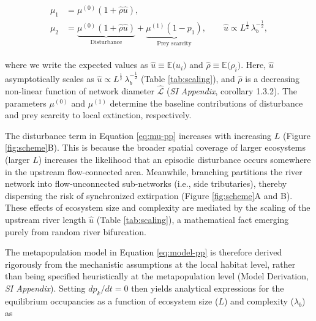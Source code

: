 \documentclass[11pt, class=article, crop=false]{standalone}
\theoremstyle{definition}
\begin{document}
\begin{align}
    \begin{split}
        \mu_1 
        &= 
        \mu^{(0)}(1 + \hat{\rho} \hat{u}),\\
        \mu_2 
        &= 
        \underbrace{\mu^{(0)}(1 + \hat{\rho} \hat{u})}_{\text{Disturbance}} + \underbrace{\mu^{(1)} (1 - p_{1})}_{\text{Prey scarcity}},
        \qquad 
        \hat{u} 
        \propto 
        L^{\frac{1}{2}}\,\lambda_b^{-\frac{1}{2}},
    \end{split}
\label{eq:mu-pp}
\end{align}

where we write the expected values as $\hat{u} \equiv \mathbb{E}\bigl(u_i\bigr)$ and $\hat{\rho} \equiv \mathbb{E}\bigl(\rho_i\bigr)$. 
Here, $\hat{u}$ asymptotically scales as $\hat{u} \propto L^{\frac{1}{2}}\,\lambda_b^{-\frac{1}{2}}$ (Table \ref{tab:scaling}), and $\hat{\rho}$ is a decreasing non-linear function of network diameter $\hat{\mathcal{L}}$ (\textit{SI Appendix}, corollary 1.3.2).
The parameters $\mu^{(0)}$ and $\mu^{(1)}$ determine the baseline contributions of disturbance and prey scarcity to local extinction, respectively.

The disturbance term in Equation \ref{eq:mu-pp} increases with increasing $L$ (Figure \ref{fig:scheme}B). 
This is because the broader spatial coverage of larger ecosystems (larger $L$) increases the likelihood that an episodic disturbance occurs somewhere in the upstream flow-connected area.
Meanwhile, branching partitions the river network into flow-unconnected sub-networks (i.e., side tributaries), thereby dispersing the risk of synchronized extirpation (Figure \ref{fig:scheme}A and B).
These effects of ecosystem size and complexity are mediated by the scaling of the upstream river length $\hat{u}$ (Table \ref{tab:scaling}), a mathematical fact emerging purely from random river bifurcation.

The metapopulation model in Equation \ref{eq:model-pp} is therefore derived rigorously from the mechanistic assumptions at the local habitat level, rather than being specified heuristically at the metapopulation level (Model Derivation, \textit{SI Appendix}).
Setting $dp_k/dt=0$ then yields analytical expressions for the equilibrium occupancies as a function of ecosystem size ($L$) and complexity ($\lambda_b$) as
\end{document}
